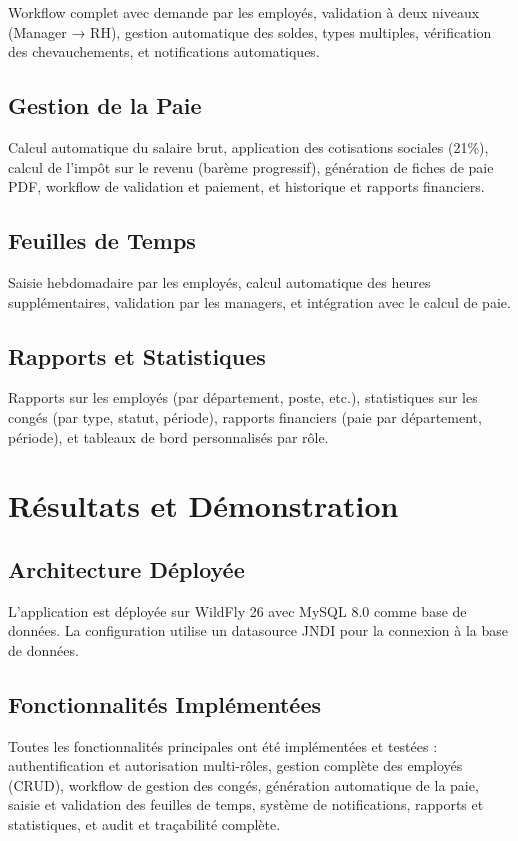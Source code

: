 \documentclass[12pt,a4paper,twoside]{report}
\begin{document}
Workflow complet avec demande par les employés, validation à deux niveaux (Manager → RH), gestion automatique des soldes, types multiples, vérification des chevauchements, et notifications automatiques.

\section{Gestion de la Paie}

Calcul automatique du salaire brut, application des cotisations sociales (21\%), calcul de l'impôt sur le revenu (barème progressif), génération de fiches de paie PDF, workflow de validation et paiement, et historique et rapports financiers.

\section{Feuilles de Temps}

Saisie hebdomadaire par les employés, calcul automatique des heures supplémentaires, validation par les managers, et intégration avec le calcul de paie.

\section{Rapports et Statistiques}

Rapports sur les employés (par département, poste, etc.), statistiques sur les congés (par type, statut, période), rapports financiers (paie par département, période), et tableaux de bord personnalisés par rôle.

\chapter{Résultats et Démonstration}

\section{Architecture Déployée}

L'application est déployée sur WildFly 26 avec MySQL 8.0 comme base de données. La configuration utilise un datasource JNDI pour la connexion à la base de données.

\section{Fonctionnalités Implémentées}

Toutes les fonctionnalités principales ont été implémentées et testées : authentification et autorisation multi-rôles, gestion complète des employés (CRUD), workflow de gestion des congés, génération automatique de la paie, saisie et validation des feuilles de temps, système de notifications, rapports et statistiques, et audit et traçabilité complète.
\end{document}
